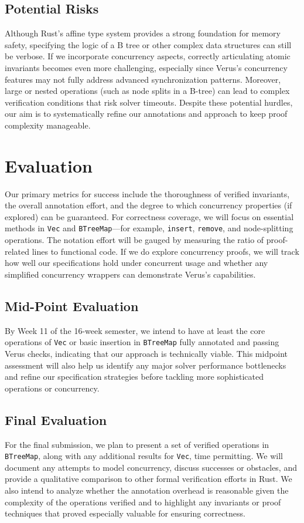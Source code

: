 \documentclass[conference]{IEEEtran}
\begin{document}
\subsection{Potential Risks}
Although Rust’s affine type system provides a strong foundation for memory safety, specifying the logic of a B tree or other complex data structures can still be verbose. If we incorporate concurrency aspects, correctly articulating atomic invariants becomes even more challenging, especially since Verus’s concurrency features may not fully address advanced synchronization patterns. Moreover, large or nested operations (such as node splits in a B-tree) can lead to complex verification conditions that risk solver timeouts. Despite these potential hurdles, our aim is to systematically refine our annotations and approach to keep proof complexity manageable.

\section{Evaluation}
Our primary metrics for success include the thoroughness of verified invariants, the overall annotation effort, and the degree to which concurrency properties (if explored) can be guaranteed. For correctness coverage, we will focus on essential methods in \texttt{Vec} and \texttt{BTreeMap}—for example, \texttt{insert}, \texttt{remove}, and node-splitting operations. The notation effort will be gauged by measuring the ratio of proof-related lines to functional code. If we do explore concurrency proofs, we will track how well our specifications hold under concurrent usage and whether any simplified concurrency wrappers can demonstrate Verus’s capabilities.

\subsection{Mid-Point Evaluation}
By Week 11 of the 16-week semester, we intend to have at least the core operations of \texttt{Vec} or basic insertion in \texttt{BTreeMap} fully annotated and passing Verus checks, indicating that our approach is technically viable. This midpoint assessment will also help us identify any major solver performance bottlenecks and refine our specification strategies before tackling more sophisticated operations or concurrency.

\subsection{Final Evaluation}
For the final submission, we plan to present a set of verified operations in \texttt{BTreeMap}, along with any additional results for \texttt{Vec}, time permitting. We will document any attempts to model concurrency, discuss successes or obstacles, and provide a qualitative comparison to other formal verification efforts in Rust. We also intend to analyze whether the annotation overhead is reasonable given the complexity of the operations verified and to highlight any invariants or proof techniques that proved especially valuable for ensuring correctness.
\end{document}
